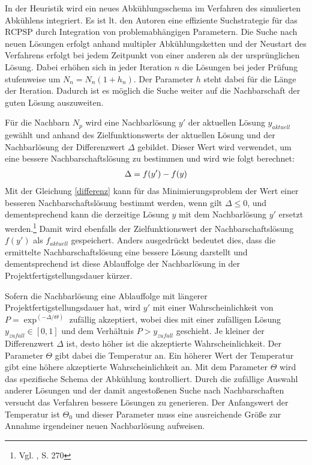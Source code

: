 \documentclass[a4paper,12pt,normalheadings,footexclude,headinclude,liststotoc,nochapterprefix,onecolumn,oneside,parskip,pointlessnumbers]{scrreprt}
\begin{document}
In der Heuristik wird ein neues Abkühlungsschema im Verfahren des simulierten Abkühlens integriert. Es ist lt. den Autoren eine effiziente Suchstrategie für das RCPSP durch Integration von problemabhängigen Parametern. Die Suche nach neuen Lösungen erfolgt anhand multipler Abkühlungsketten und der Neustart des Verfahrens erfolgt bei jedem Zeitpunkt von einer anderen als der ursprünglichen Lösung. Dabei erhöhen sich in jeder Iteration $n$ die Lösungen bei jeder Prüfung stufenweise um $N_{n}=N_{n}(1+h_{n})$. Der Parameter $h$ steht dabei für die Länge der Iteration. Dadurch ist es möglich die Suche weiter auf die Nachbarschaft der guten Lösung auszuweiten.


Für die Nachbarn $N_{p}$ wird eine Nachbarlösung $y'$ der aktuellen Lösung $y_{aktuell}$ gewählt und anhand des Zielfunktionswerts der aktuellen Lösung und der Nachbarlösung der Differenzwert $\Delta$ gebildet. Dieser Wert wird verwendet, um eine bessere Nachbarschaftslösung zu bestimmen und wird wie folgt berechnet:
\begin{eqnarray} \label{differenz}
\Delta =f(y')-f(y)\hfill 
\end{eqnarray}
Mit der Gleichung \eqref{differenz} kann für das Minimierungsproblem der Wert einer besseren Nachbarschaftslösung bestimmt werden, wenn gilt $\Delta\le0$, und dementsprechend kann die derzeitige Lösung $y$ mit dem Nachbarlösung $y'$ ersetzt werden.\footnote{Vgl. \cite{bouleimen2003new}, S. 270} Damit wird ebenfalls der Zielfunktionswert der Nachbarschaftslösung $f(y')$ als $f_{aktuell}$ gespeichert. Anders ausgedrückt bedeutet dies, dass die ermittelte Nachbarschaftslösung eine bessere Lösung darstellt und dementsprechend ist diese Ablauffolge der Nachbarlösung in der Projektfertigstellungsdauer kürzer.

Sofern die Nachbarlösung eine Ablauffolge mit längerer Projektfertigstellungsdauer hat, wird $y'$ mit einer Wahrscheinlichkeit von $P=\exp^{(-\Delta/\Theta)}$ zufällig akzeptiert, wobei dies mit einer zufälligen Lösung $y_{zufall}\in [0,1]$ und dem Verhältnis $P>y_{zufall}$ geschieht. Je kleiner der Differenzwert $\Delta$ ist, desto höher ist die akzeptierte Wahrscheinlichkeit. Der Parameter $\Theta$ gibt dabei die Temperatur an. Ein höherer Wert der Temperatur gibt eine höhere akzeptierte Wahrscheinlichkeit an. Mit dem Parameter $\Theta$ wird das spezifische Schema der Abkühlung kontrolliert. Durch die zufällige Auswahl anderer Lösungen und der damit angestoßenen Suche nach Nachbarschaften versucht das Verfahren bessere Lösungen zu generieren. Der Anfangswert der Temperatur ist $\Theta_{0}$ und dieser Parameter muss eine ausreichende Größe zur Annahme irgendeiner neuen Nachbarlösung aufweisen.
\end{document}
